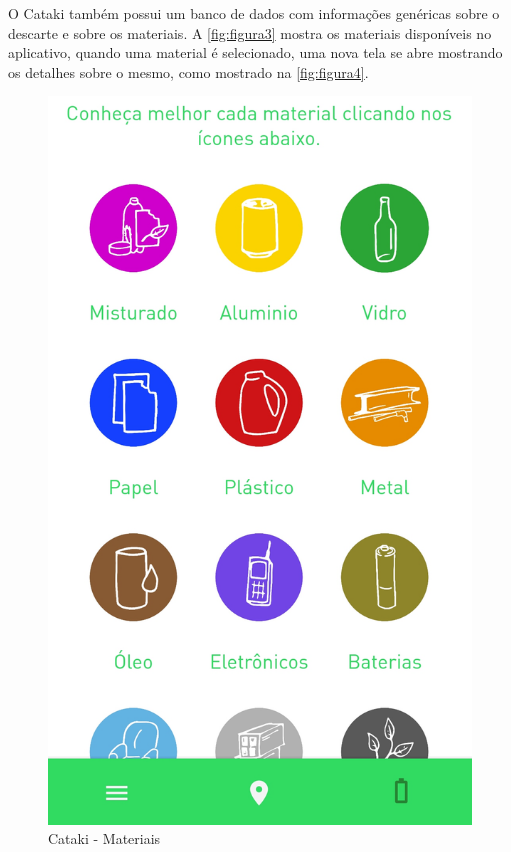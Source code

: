 \documentclass[
	12pt,				%
	openright,			%
	twoside,			%
	a4paper,			%
	english,			%
	french,				%
	spanish,			%
	brazil				%
	]{abntex2}
\begin{document}
\newpage
O Cataki também possui um banco de dados com informações genéricas sobre o descarte e sobre os materiais. A \autoref{fig:figura3} mostra os materiais disponíveis no aplicativo, quando uma material é selecionado, uma nova tela se abre mostrando os detalhes sobre o mesmo, como mostrado na \autoref{fig:figura4}. \\
     \begin{figure}[htb]    
 \centering
  \begin{minipage}{0.45\textwidth}
    \centering
    \caption{Cataki - Materiais}
    \includegraphics[scale=0.15]{media/catakimateriais.png}   

\end{minipage}
\end{figure}
\end{document}
